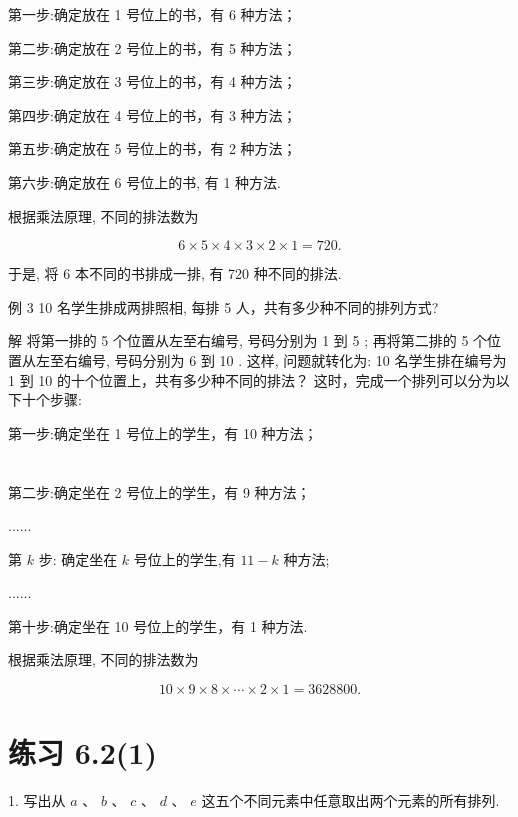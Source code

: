 \documentclass[10pt]{article}
\begin{document}
第一步:确定放在 1 号位上的书，有 6 种方法；

第二步:确定放在 2 号位上的书，有 5 种方法；

第三步:确定放在 3 号位上的书，有 4 种方法；

第四步:确定放在 4 号位上的书，有 3 种方法；

第五步:确定放在 5 号位上的书，有 2 种方法；

第六步:确定放在 6 号位上的书, 有 1 种方法.

根据乘法原理, 不同的排法数为

\[
6 \times  5 \times  4 \times  3 \times  2 \times  1 = {720}.
\]

于是, 将 6 本不同的书排成一排, 有 720 种不同的排法.

例 3 10 名学生排成两排照相, 每排 5 人，共有多少种不同的排列方式?

解 将第一排的 5 个位置从左至右编号, 号码分别为 1 到 5 ; 再将第二排的 5 个位置从左至右编号, 号码分别为 6 到 10 . 这样, 问题就转化为: 10 名学生排在编号为 1 到 10 的十个位置上，共有多少种不同的排法？ 这时，完成一个排列可以分为以下十个步骤:

第一步:确定坐在 1 号位上的学生，有 10 种方法；

\section*{}

\section*{}

第二步:确定坐在 2 号位上的学生，有 9 种方法；

......

第 \(k\) 步: 确定坐在 \(k\) 号位上的学生,有 \({11} - k\) 种方法;

......

第十步:确定坐在 10 号位上的学生，有 1 种方法.

根据乘法原理, 不同的排法数为

\[
{10} \times  9 \times  8 \times  \cdots  \times  2 \times  1 = {3628800}.
\]

\section*{练习 6.2(1)}

1. 写出从 \(a\text{ 、 }b\text{ 、 }c\text{ 、 }d\text{ 、 }e\) 这五个不同元素中任意取出两个元素的所有排列.
\end{document}
